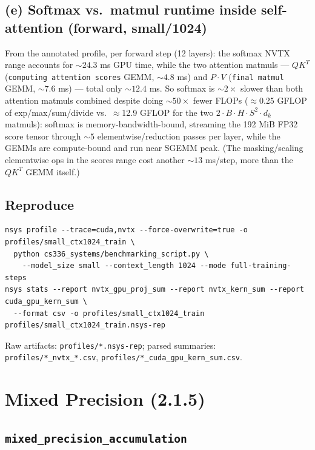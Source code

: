\documentclass[11pt]{article}
\newcommand{\code}[1]{\texttt{#1}}
\begin{document}
\subsection{(e) Softmax vs.\ matmul runtime inside self-attention (forward, small/1024)}

From the annotated profile, per forward step (12 layers): the softmax NVTX range accounts for
${\sim}24.3$ ms GPU time, while the two attention matmuls --- $QK^T$ (\code{computing attention
scores} GEMM, ${\sim}4.8$ ms) and $P\!\cdot\!V$ (\code{final matmul} GEMM, ${\sim}7.6$ ms) --- total
only ${\sim}12.4$ ms. So softmax is ${\sim}2\times$ slower than both attention matmuls combined
despite doing ${\sim}50\times$ fewer FLOPs ($\approx$0.25 GFLOP of exp/max/sum/divide vs.\
$\approx$12.9 GFLOP for the two $2\cdot B\cdot H\cdot S^2\cdot d_k$ matmuls): softmax is
memory-bandwidth-bound, streaming the 192 MiB FP32 score tensor through ${\sim}5$
elementwise/reduction passes per layer, while the GEMMs are compute-bound and run near SGEMM peak.
(The masking/scaling elementwise ops in the scores range cost another ${\sim}13$ ms/step, more than
the $QK^T$ GEMM itself.)

\subsection{Reproduce}

\begin{lstlisting}
nsys profile --trace=cuda,nvtx --force-overwrite=true -o profiles/small_ctx1024_train \
  python cs336_systems/benchmarking_script.py \
    --model_size small --context_length 1024 --mode full-training-steps
nsys stats --report nvtx_gpu_proj_sum --report nvtx_kern_sum --report cuda_gpu_kern_sum \
  --format csv -o profiles/small_ctx1024_train profiles/small_ctx1024_train.nsys-rep
\end{lstlisting}

Raw artifacts: \code{profiles/*.nsys-rep}; parsed summaries: \code{profiles/*\_nvtx\_*.csv},
\code{profiles/*\_cuda\_gpu\_kern\_sum.csv}.

\section{Mixed Precision (2.1.5)}

\subsection{\texttt{mixed\_precision\_accumulation}}
\end{document}
